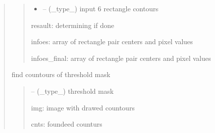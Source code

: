 \documentclass[letterpaper,10pt,english]{sphinxmanual}
\begin{document}
\begin{quote}
\begin{savenotes}
\begin{fulllineitems}
\begin{savenotes}
\begin{fulllineitems}
\begin{quote}
\begin{description}
\begin{itemize}
\item {} 
\sphinxAtStartPar
{} – (\_type\_) input 6 rectangle contours

\end{itemize}

\sphinxAtStartPar
resault: determining if done

\sphinxAtStartPar
infoes: array of rectangle pair centers and pixel values

\sphinxAtStartPar
infoes\_final: array of rectangle pair centers and pixel values

\end{description}\end{quote}

\end{fulllineitems}\end{savenotes}


\begin{savenotes}\begin{fulllineitems}
\label{\detokenize{setting/backend/pxvalue_calibration:oxin.backend.pxvalue_calibration.extract_info.find_contours}}
\pysigstartsignatures
{}
\pysigstopsignatures
\sphinxAtStartPar
find countours of threshold mask
\begin{quote}\begin{description}
\sphinxAtStartPar
{} – (\_type\_) threshold mask

\sphinxAtStartPar
img: image with drawed countours

\sphinxAtStartPar
cnts: foundeed counturs

\end{description}\end{quote}

\end{fulllineitems}\end{savenotes}



\end{fulllineitems}
\end{savenotes}
\end{quote}
\end{document}
